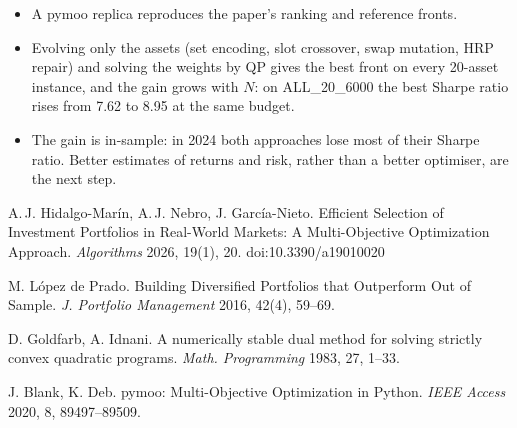 \vspace{\rowgap}
\hspace*{24mm}%
\begin{minipage}[t]{\wide}\body
  \begin{itemize}
    \item A pymoo replica reproduces the paper's ranking and reference fronts.
    \item Evolving only the assets (set encoding, slot crossover, swap mutation, HRP repair) and solving the
    weights by QP gives the best front on every 20-asset instance, and the gain grows with $N$: on
    ALL\_20\_6000 the best Sharpe ratio rises from 7.62 to 8.95 at the same budget.
    \item The gain is in-sample: in 2024 both approaches lose most of their Sharpe ratio. Better estimates of
    returns and risk, rather than a better optimiser, are the next step.
  \end{itemize}
\end{minipage}%
\hspace{\gap}%
\begin{minipage}[t]{\colw}\fontsize{18pt}{23pt}\selectfont\raggedright
  \vspace{-2mm}
  \begin{enumerate}[label={[\arabic*]}, leftmargin=1.8em, itemsep=2mm, topsep=0mm]
    \item A.\,J. Hidalgo-Marín, A.\,J. Nebro, J. García-Nieto. Efficient Selection of Investment Portfolios in
    Real-World Markets: A Multi-Objective Optimization Approach. \emph{Algorithms} 2026, 19(1), 20.
    doi:10.3390/a19010020
    \item M. López de Prado. Building Diversified Portfolios that Outperform Out of Sample. \emph{J. Portfolio
    Management} 2016, 42(4), 59--69.
    \item D. Goldfarb, A. Idnani. A numerically stable dual method for solving strictly convex quadratic
    programs. \emph{Math. Programming} 1983, 27, 1--33.
    \item J. Blank, K. Deb. pymoo: Multi-Objective Optimization in Python. \emph{IEEE Access} 2020, 8,
    89497--89509.
  \end{enumerate}
\end{minipage}


